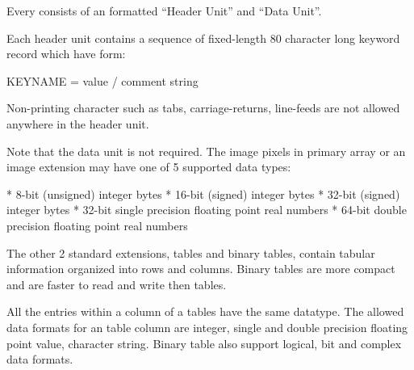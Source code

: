 Every  consists of an  formatted ``Header Unit'' and
``Data Unit''.

Each header unit contains a sequence of fixed-length 80
character long keyword record which have form:

\begtt
KEYNAME = value / comment string
\endtt

Non-printing  character such as tabs,
carriage-returns, line-feeds are not allowed anywhere in
the header unit.

Note that the data unit is not required. The image pixels
in primary array or an image extension may have one of
5 supported data types:

\begitems
* 8-bit (unsigned) integer bytes
* 16-bit (signed) integer bytes
* 32-bit (signed) integer bytes
* 32-bit single precision floating point real numbers
* 64-bit double precision floating point real numbers
\enditems

The other 2 standard extensions,  tables and binary
tables, contain tabular information organized into rows
and columns. Binary tables are more compact and are faster
to read and write then  tables.

All the entries within a column of a tables have the same
datatype. The allowed data formats for an  table
column are integer, single and double precision floating
point value, character string. Binary table also support
logical, bit and complex data formats.
